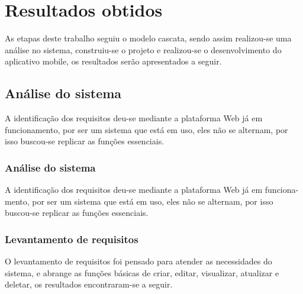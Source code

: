 \chapter{Resultados obtidos}
As etapas deste trabalho seguiu o modelo cascata, sendo assim realizou-se uma análise no sistema, construiu-se o projeto e realizou-se o desenvolvimento do aplicativo mobile, os resultados serão apresentados a seguir.

\section{Análise do sistema}
A identificação dos requisitos deu-se mediante a plataforma Web já em funcionamento, por ser um sistema que está em uso, eles não se alternam, por isso buscou-se replicar as funções essenciais.
    
    \subsection{Análise do sistema}
    A identificação dos requisitos deu-se mediante a plataforma Web já em funciona- mento, por ser um sistema que está em uso, eles não se alternam, por isso buscou-se replicar as funções essenciais.

    
    \subsection{Levantamento de requisitos}
    O levantamento de requisitos foi pensado para atender as necessidades do sistema, e   abrange as funções básicas de criar, editar, visualizar, atualizar e deletar, os resultados  encontraram-se a seguir.
    


